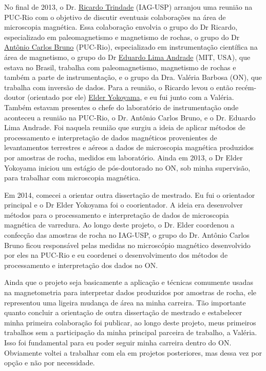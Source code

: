 No final de 2013, o Dr. \href{https://lattes.cnpq.br/3934334115083849}{Ricardo Trindade} (IAG-USP) arranjou uma reunião na
PUC-Rio com o objetivo de discutir eventuais colaborações na área de microscopia
magnética. Essa colaboração envolvia o grupo do Dr Ricardo, especializado em
paleomagnetismo e magnetismo de rochas, o grupo do Dr \href{https://lattes.cnpq.br/8840926029509231}{Antônio Carlos Bruno}
(PUC-Rio), especializado em instrumentação científica na área de magnetismo,
o grupo do Dr \href{https://eapsweb.mit.edu/people/limaea}{Eduardo Lima Andrade} (MIT, USA), que estava no Brasil, trabalha com paleomagnetismo,
magnetismo de rochas e também a parte de instrumentação, e o grupo da Dra. Valéria
Barbosa (ON), que trabalha com inversão de dados.
Para a reunião, o Ricardo levou o então recém-doutor (orientado por ele)
\href{https://lattes.cnpq.br/9806242954314478}{Elder Yokoyama}, e eu fui junto com a 
Valéria. Também estavam presentes o chefe
do laboratório de instrumentação onde aconteceu a reunião na PUC-Rio, o Dr.
Antônio Carlos Bruno, e o Dr. Eduardo Lima Andrade.
Foi naquela reunião que surgiu a ideia de aplicar métodos de processamento e
interpretação de dados magnéticos provenientes de levantamentos terrestres e 
aéreos a dados de microscopia magnética produzidos por amostras de rocha,
medidos em laboratório.
Ainda em 2013, o Dr Elder Yokoyama iniciou um estágio de pós-doutorado no ON,
sob minha supervisão, para trabalhar com microscopia magnética.

Em 2014, comecei a orientar outra dissertação de mestrado. 
Eu fui o orientador principal e o Dr Elder Yokoyama foi o coorientador. 
A ideia era desenvolver métodos para o processamento e interpretação 
de dados de microscopia magnética de varredura. Ao longo deste projeto, o Dr. Elder
coordenou a confecção das amostras de rocha no IAG-USP, o grupo do Dr. Antônio Carlos Bruno
ficou responsável pelas medidas no microscópio magnético desenvolvido por eles na PUC-Rio 
e eu coordenei o desenvolvimento dos métodos de processamento e interpretação dos dados
no ON.

Ainda que o projeto seja basicamente a aplicação e técnicas comumente usadas na 
magnetometria para interpretar dados produzidos por amostras de rocha, ele representou 
uma ligeira mudança de área na minha carreira. Tão importante quanto concluir a 
orientação de outra dissertação de mestrado e estabelecer minha primeira colaboração foi 
publicar, ao longo deste projeto, meus primeiros trabalhos sem a participação da 
minha principal parceira de trabalho, a Valéria. Isso foi fundamental para 
eu poder seguir minha carreira dentro do ON. Obviamente voltei a 
trabalhar com ela em projetos posteriores, mas dessa vez por opção e não por necessidade.

